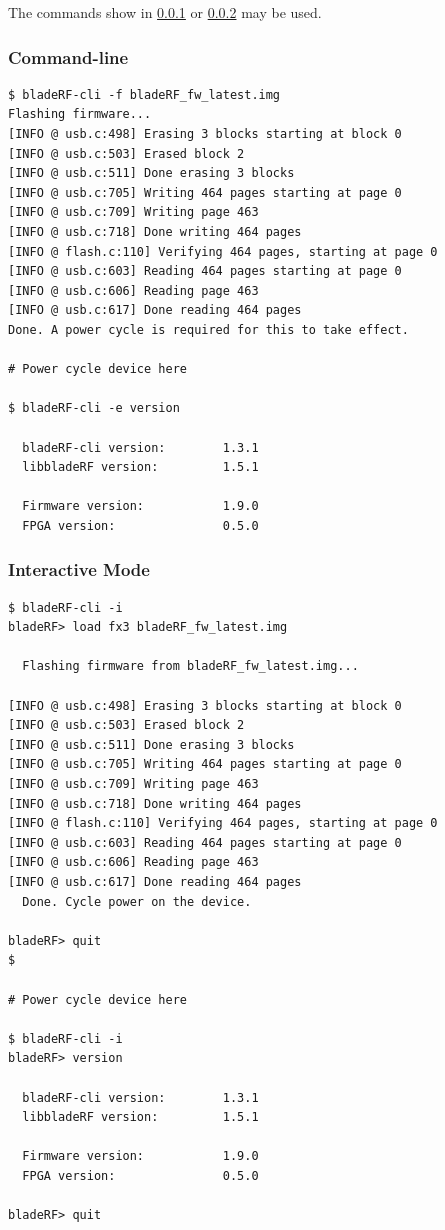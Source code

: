 The commands show in \ref{sec:fw-upgrade-cli} or \ref{sec:fw-upgrade-interactive}
may be used.

\newpage
\subsubsection{Command-line} \label{sec:fw-upgrade-cli}
\begin{lstlisting}[style=numbered-snippet]
$ bladeRF-cli -f bladeRF_fw_latest.img
Flashing firmware...
[INFO @ usb.c:498] Erasing 3 blocks starting at block 0
[INFO @ usb.c:503] Erased block 2
[INFO @ usb.c:511] Done erasing 3 blocks
[INFO @ usb.c:705] Writing 464 pages starting at page 0
[INFO @ usb.c:709] Writing page 463
[INFO @ usb.c:718] Done writing 464 pages
[INFO @ flash.c:110] Verifying 464 pages, starting at page 0
[INFO @ usb.c:603] Reading 464 pages starting at page 0
[INFO @ usb.c:606] Reading page 463
[INFO @ usb.c:617] Done reading 464 pages
Done. A power cycle is required for this to take effect.

# Power cycle device here

$ bladeRF-cli -e version

  bladeRF-cli version:        1.3.1
  libbladeRF version:         1.5.1

  Firmware version:           1.9.0
  FPGA version:               0.5.0
\end{lstlisting}

\subsubsection{Interactive Mode} \label{sec:fw-upgrade-interactive}
\begin{lstlisting}[style=numbered-snippet]
$ bladeRF-cli -i
bladeRF> load fx3 bladeRF_fw_latest.img

  Flashing firmware from bladeRF_fw_latest.img...

[INFO @ usb.c:498] Erasing 3 blocks starting at block 0
[INFO @ usb.c:503] Erased block 2
[INFO @ usb.c:511] Done erasing 3 blocks
[INFO @ usb.c:705] Writing 464 pages starting at page 0
[INFO @ usb.c:709] Writing page 463
[INFO @ usb.c:718] Done writing 464 pages
[INFO @ flash.c:110] Verifying 464 pages, starting at page 0
[INFO @ usb.c:603] Reading 464 pages starting at page 0
[INFO @ usb.c:606] Reading page 463
[INFO @ usb.c:617] Done reading 464 pages
  Done. Cycle power on the device.

bladeRF> quit
$

# Power cycle device here

$ bladeRF-cli -i
bladeRF> version

  bladeRF-cli version:        1.3.1
  libbladeRF version:         1.5.1

  Firmware version:           1.9.0
  FPGA version:               0.5.0

bladeRF> quit
\end{lstlisting}

